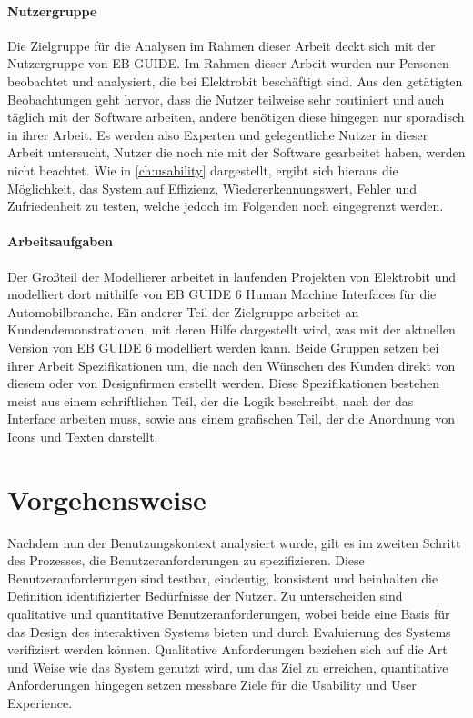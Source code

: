 \paragraph{Nutzergruppe}
Die Zielgruppe für die Analysen im Rahmen dieser Arbeit deckt sich  mit der Nutzergruppe von EB GUIDE.
Im Rahmen dieser Arbeit wurden nur Personen beobachtet und analysiert, die bei Elektrobit beschäftigt sind.
Aus den getätigten Beobachtungen geht hervor, dass die Nutzer teilweise sehr routiniert und auch täglich mit der Software arbeiten, andere benötigen diese hingegen nur sporadisch in ihrer Arbeit.
Es werden also Experten und gelegentliche Nutzer in dieser Arbeit untersucht, Nutzer die noch nie mit der Software gearbeitet haben, werden nicht beachtet.
Wie in \cref{ch:usability} dargestellt, ergibt sich hieraus die Möglichkeit, das System auf Effizienz, Wiedererkennungswert, Fehler und Zufriedenheit zu testen, welche jedoch im Folgenden noch eingegrenzt werden.

\paragraph{Arbeitsaufgaben}
Der Großteil der Modellierer arbeitet in laufenden Projekten von Elektrobit und modelliert dort mithilfe von EB GUIDE 6 Human Machine Interfaces für die Automobilbranche.
Ein anderer Teil der Zielgruppe arbeitet an Kundendemonstrationen, mit deren Hilfe dargestellt wird, was mit der aktuellen Version von EB GUIDE 6 modelliert werden kann.
Beide Gruppen setzen bei ihrer Arbeit Spezifikationen um, die nach den Wünschen des Kunden direkt von diesem oder von Designfirmen erstellt werden.
Diese Spezifikationen bestehen meist aus einem schriftlichen Teil, der die Logik beschreibt, nach der das Interface arbeiten muss, sowie aus einem grafischen Teil, der die Anordnung von Icons und Texten darstellt.

\section{Vorgehensweise}
Nachdem nun der Benutzungskontext analysiert wurde, gilt es im zweiten Schritt des Prozesses, die Benutzeranforderungen zu spezifizieren.
Diese Benutzeranforderungen sind testbar, eindeutig, konsistent und beinhalten die Definition identifizierter Bedürfnisse der Nutzer.
Zu unterscheiden sind qualitative und quantitative Benutzeranforderungen, wobei beide eine Basis für das Design des interaktiven Systems bieten und durch Evaluierung des Systems verifiziert werden können.
Qualitative Anforderungen beziehen sich auf die Art und Weise wie das System genutzt wird, um das Ziel zu erreichen, quantitative Anforderungen hingegen setzen messbare Ziele für die Usability und User Experience.\cite{.f}

